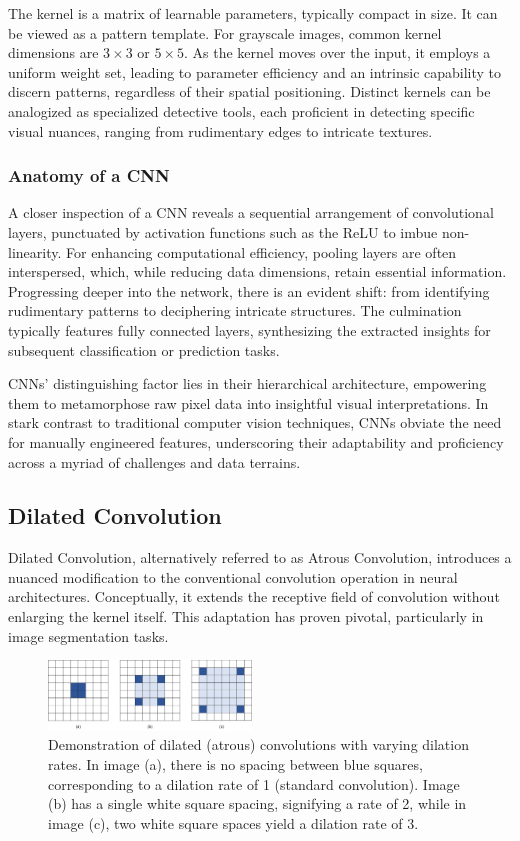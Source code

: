 \documentclass[10pt,twocolumn,letterpaper]{article}
\begin{document}
The kernel is a matrix of learnable parameters, typically compact in size. It can be viewed as a pattern template. For grayscale images, common kernel dimensions are \(3 \times 3\) or \(5 \times 5\). As the kernel moves over the input, it employs a uniform weight set, leading to parameter efficiency and an intrinsic capability to discern patterns, regardless of their spatial positioning. Distinct kernels can be analogized as specialized detective tools, each proficient in detecting specific visual nuances, ranging from rudimentary edges to intricate textures.

\subsubsection{Anatomy of a CNN}

A closer inspection of a CNN reveals a sequential arrangement of convolutional layers, punctuated by activation functions such as the ReLU to imbue non-linearity. For enhancing computational efficiency, pooling layers are often interspersed, which, while reducing data dimensions, retain essential information. Progressing deeper into the network, there is an evident shift: from identifying rudimentary patterns to deciphering intricate structures. The culmination typically features fully connected layers, synthesizing the extracted insights for subsequent classification or prediction tasks.

CNNs' distinguishing factor lies in their hierarchical architecture, empowering them to metamorphose raw pixel data into insightful visual interpretations. In stark contrast to traditional computer vision techniques, CNNs obviate the need for manually engineered features, underscoring their adaptability and proficiency across a myriad of challenges and data terrains.

\subsection{Dilated Convolution}

Dilated Convolution, alternatively referred to as Atrous Convolution, introduces a nuanced modification to the conventional convolution operation in neural architectures. Conceptually, it extends the receptive field of convolution without enlarging the kernel itself. This adaptation has proven pivotal, particularly in image segmentation tasks.

\begin{figure}[htbp]
   \centering
   \includegraphics[width=0.48\textwidth]{Fig/2.pdf}
   \caption{Demonstration of dilated (atrous) convolutions with varying dilation rates. In image (a), there is no spacing between blue squares, corresponding to a dilation rate of 1 (standard convolution). Image (b) has a single white square spacing, signifying a rate of 2, while in image (c), two white square spaces yield a dilation rate of 3.}
   \label{fig2}
\end{figure}
\end{document}

